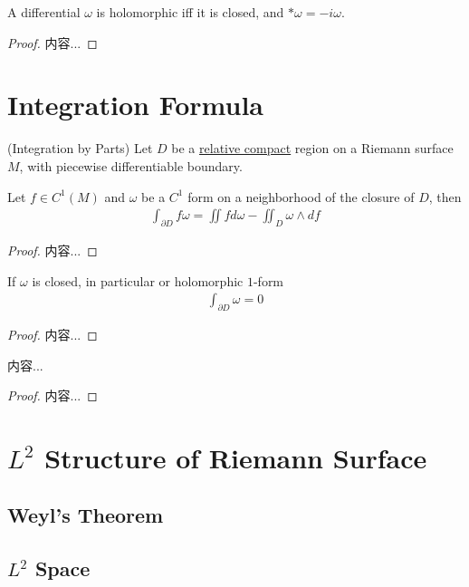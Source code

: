 \documentclass[Total.tex]{subfiles}
\begin{document}
		\begin{corollary}
			A differential $\omega$ is holomorphic iff it is closed, and $*\omega=-i\omega$. 
		\end{corollary}
		\begin{proof}
			内容...
		\end{proof}
	\section{Integration Formula}
		\begin{theorem}
			(Integration by Parts) Let $D$ be a \underline{relative compact} region on a Riemann surface $M$, with piecewise differentiable boundary.
			
			Let $f\in C^1(M)$ and $\omega$ be a $C^1$ form on a neighborhood of the closure of $D$, then
			\begin{gather*}
				\int_{\partial D} f\omega=\iint fd\omega-\iint_D \omega\wedge df
			\end{gather*}
		\end{theorem}
		\begin{proof}
			内容...
		\end{proof}
		
		\begin{corollary}
			If $\omega$ is closed, in particular or holomorphic $1$-form
			\begin{gather*}
				\int_{\partial D} \omega=0
			\end{gather*}
		\end{corollary}
		\begin{proof}
			内容...
		\end{proof}
		
		\begin{corollary}
			内容...
		\end{corollary}
		\begin{proof}
			内容...
		\end{proof}
	\section{$L^2$ Structure of Riemann Surface}
		\subsection{Weyl's Theorem}
		
		\subsection{$L^2$ Space}
\end{document}
